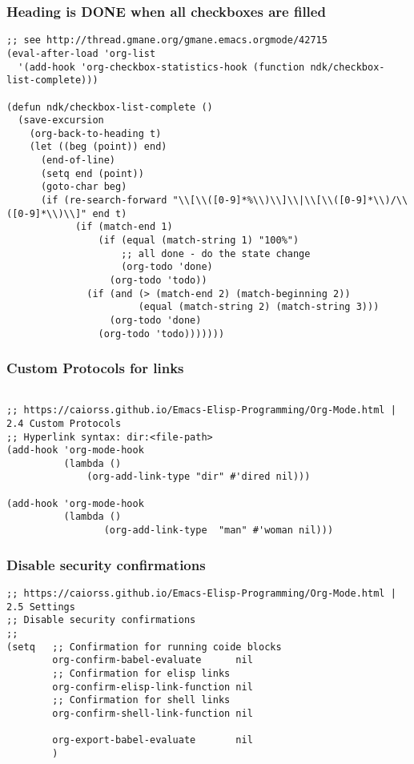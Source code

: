 \documentclass[11pt]{article}
\begin{document}
\subsubsection{Heading is DONE when all checkboxes are filled}
\label{sec:org1d4bd4c}
\begin{verbatim}
;; see http://thread.gmane.org/gmane.emacs.orgmode/42715
(eval-after-load 'org-list
  '(add-hook 'org-checkbox-statistics-hook (function ndk/checkbox-list-complete)))

(defun ndk/checkbox-list-complete ()
  (save-excursion
    (org-back-to-heading t)
    (let ((beg (point)) end)
      (end-of-line)
      (setq end (point))
      (goto-char beg)
      (if (re-search-forward "\\[\\([0-9]*%\\)\\]\\|\\[\\([0-9]*\\)/\\([0-9]*\\)\\]" end t)
            (if (match-end 1)
                (if (equal (match-string 1) "100%")
                    ;; all done - do the state change
                    (org-todo 'done)
                  (org-todo 'todo))
              (if (and (> (match-end 2) (match-beginning 2))
                       (equal (match-string 2) (match-string 3)))
                  (org-todo 'done)
                (org-todo 'todo)))))))
\end{verbatim}
\subsubsection{Custom Protocols for links}
\label{sec:orgbf7e140}
\begin{verbatim}

;; https://caiorss.github.io/Emacs-Elisp-Programming/Org-Mode.html | 2.4 Custom Protocols
;; Hyperlink syntax: dir:<file-path>
(add-hook 'org-mode-hook
          (lambda ()
              (org-add-link-type "dir" #'dired nil)))

(add-hook 'org-mode-hook
          (lambda ()
                 (org-add-link-type  "man" #'woman nil)))
\end{verbatim}


\subsubsection{Disable security confirmations}
\label{sec:org1524517}
\begin{verbatim}
;; https://caiorss.github.io/Emacs-Elisp-Programming/Org-Mode.html | 2.5 Settings
;; Disable security confirmations
;;
(setq   ;; Confirmation for running coide blocks
        org-confirm-babel-evaluate      nil
        ;; Confirmation for elisp links
        org-confirm-elisp-link-function nil
        ;; Confirmation for shell links
        org-confirm-shell-link-function nil

        org-export-babel-evaluate       nil
        )
\end{verbatim}
\end{document}
